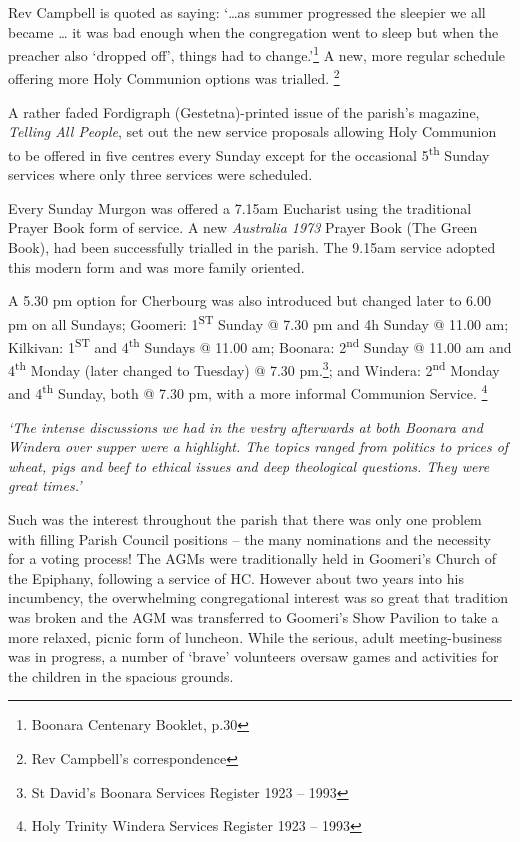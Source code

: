 Rev Campbell is quoted as saying: `\ldots as summer progressed the sleepier we all became \ldots{} it was bad enough when the congregation went to sleep but when the preacher also `dropped off', things had to change.'\footnote{Boonara Centenary Booklet, p.30} A new, more regular schedule offering more Holy Communion options was trialled. \footnote{Rev Campbell's correspondence}


A rather faded Fordigraph (Gestetna)-printed issue of the parish's magazine, \emph{Telling All People}, set out the new service proposals allowing Holy Communion to be offered in five centres every Sunday except for the occasional 5\textsuperscript{th} Sunday services where only three services were scheduled.



Every Sunday Murgon was offered a 7.15am Eucharist using the traditional Prayer Book form of service. A new \emph{Australia 1973} Prayer Book (The Green Book), had been successfully trialled in the parish. The 9.15am service adopted this modern form and was more family oriented.



A 5.30 pm option for Cherbourg was also introduced but changed later to 6.00 pm on all Sundays; Goomeri: 1\textsuperscript{ST} Sunday @ 7.30 pm and 4h Sunday @ 11.00 am; Kilkivan: 1\textsuperscript{ST} and 4\textsuperscript{th} Sundays @ 11.00 am; Boonara: 2\textsuperscript{nd} Sunday @ 11.00 am and 4\textsuperscript{th} Monday (later changed to Tuesday) @ 7.30 pm.\footnote{St David's Boonara Services Register 1923 -- 1993}; and Windera: 2\textsuperscript{nd} Monday and 4\textsuperscript{th} Sunday, both @ 7.30 pm, with a more informal Communion Service. \footnote{Holy Trinity Windera Services Register 1923 -- 1993}


\emph{`The intense discussions we had in the vestry afterwards at both Boonara and Windera over supper were a highlight. The topics ranged from politics to prices of wheat, pigs and beef to ethical issues and deep theological questions. They were great times.'}



Such was the interest throughout the parish that there was only one problem with filling Parish Council positions -- the many nominations and the necessity for a voting process! The AGMs were traditionally held in Goomeri's Church of the Epiphany, following a service of HC. However about two years into his incumbency, the overwhelming congregational interest was so great that tradition was broken and the AGM was transferred to Goomeri's Show Pavilion to take a more relaxed, picnic form of luncheon. While the serious, adult meeting-business was in progress, a number of `brave' volunteers oversaw games and activities for the children in the spacious grounds.



